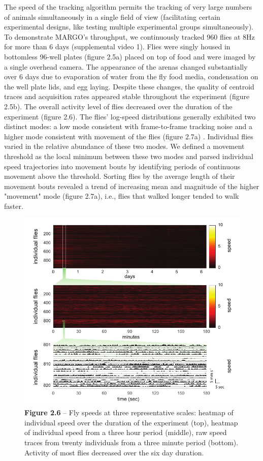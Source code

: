 \documentclass[12pt,letterpaper]{article}
\begin{document}
The speed of the tracking algorithm permits the tracking of very large numbers of animals simultaneously in a single field of view (facilitating certain experimental designs, like testing multiple experimental groups simultaneously). To demonstrate MARGO's throughput, we continuously tracked 960 flies at 8Hz for more than 6 days (supplemental video 1). Flies were singly housed in bottomless 96-well plates (figure 2.5a) placed on top of food and were imaged by a single overhead camera. The appearance of the arenas changed substantially over 6 days due to evaporation of water from the fly food media, condensation on the well plate lids, and egg laying. Despite these changes, the quality of centroid traces and acquisition rates appeared stable throughout the experiment (figure 2.5b). The overall activity level of flies decreased over the duration of the experiment (figure 2.6). The flies' log-speed distributions generally exhibited two distinct modes: a low mode consistent with frame-to-frame tracking noise and a higher mode consistent with movement of the flies (figure 2.7a) \cite{berman_choi_bialek_shaevitz_2014,Crall_2016_cockroach}. Individual flies varied in the relative abundance of these two modes. We defined a movement threshold as the local minimum between these two modes and parsed individual speed trajectories into movement bouts by identifying periods of continuous movement above the threshold. Sorting flies by the average length of their movement bouts revealed a trend of increasing mean and magnitude of the higher "movement" mode (figure 2.7a), i.e., flies that walked longer tended to walk faster.

\begin{figure}[t!]
 \includegraphics[width=\textwidth]{../figures/chapter_2/fig_2-6.pdf}
 \caption*{\textbf{Figure 2.6} -- Fly speeds at three representative scales: heatmap of individual speed over the duration of the experiment (top), heatmap of individual speed from a three hour period (middle), raw speed traces from twenty individuals from a three minute period (bottom). Activity of most flies decreased over the six day duration.}
\end{figure}
\end{document}
